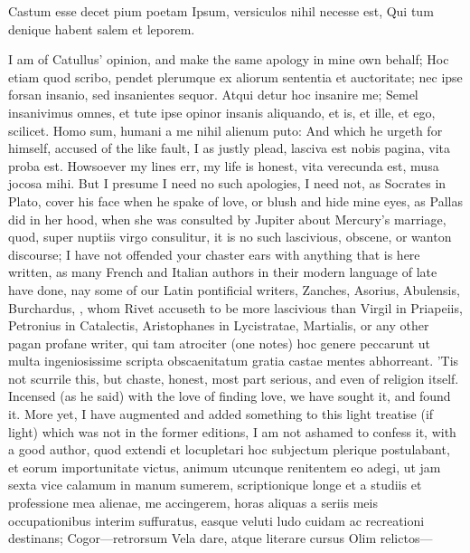 {Castum esse decet pium poetam
Ipsum, versiculos nihil necesse est,
Qui tum denique habent salem et leporem.

I am of Catullus' opinion, and make the same apology in mine own
behalf; Hoc etiam quod scribo, pendet plerumque ex aliorum sententia et
auctoritate; nec ipse forsan insanio, sed insanientes sequor. Atqui
detur hoc insanire me; Semel insanivimus omnes, et tute ipse opinor
insanis aliquando, et is, et ille, et ego, scilicet. Homo sum,
humani a me nihil alienum puto: And which he urgeth for himself,
accused of the like fault, I as justly plead, lasciva est nobis
pagina, vita proba est. Howsoever my lines err, my life is honest,
vita verecunda est, musa jocosa mihi. But I presume I need no
such apologies, I need not, as Socrates in Plato, cover his face when
he spake of love, or blush and hide mine eyes, as Pallas did in her
hood, when she was consulted by Jupiter about Mercury's marriage, quod,
super nuptiis virgo consulitur, it is no such lascivious, obscene, or
wanton discourse; I have not offended your chaster ears with anything
that is here written, as many French and Italian authors in their
modern language of late have done, nay some of our Latin pontificial
writers, Zanches, Asorius, Abulensis, Burchardus, \etc{}, whom Rivet
accuseth to be more lascivious than Virgil in Priapeiis, Petronius in
Catalectis, Aristophanes in Lycistratae, Martialis, or any other pagan
profane writer, qui tam atrociter (one notes) hoc genere
peccarunt ut multa ingeniosissime scripta obscaenitatum gratia castae
mentes abhorreant. 'Tis not scurrile this, but chaste, honest, most
part serious, and even of religion itself. Incensed (as he said)
with the love of finding love, we have sought it, and found it. More
yet, I have augmented and added something to this light treatise (if
light) which was not in the former editions, I am not ashamed to
confess it, with a good author, quod extendi et locupletari hoc
subjectum plerique postulabant, et eorum importunitate victus, animum
utcunque renitentem eo adegi, ut jam sexta vice calamum in manum
sumerem, scriptionique longe et a studiis et professione mea alienae,
me accingerem, horas aliquas a seriis meis occupationibus interim
suffuratus, easque veluti ludo cuidam ac recreationi destinans;
Cogor---retrorsum
Vela dare, atque literare cursus
Olim relictos---

}
